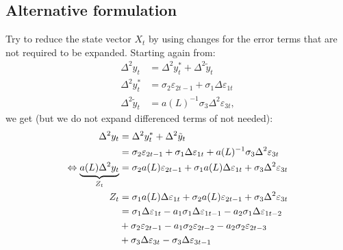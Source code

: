\documentclass[a4paper,12pt]{article}
\begin{document}
\pagebreak 

\subsection{Alternative formulation}

Try to reduce the state vector $X_{t}$ by using changes for the error terms
that are not required to be expanded. Starting again from:%
\begin{align}
\Delta ^{2}y_{t}& =\Delta ^{2}y_{t}^{\ast }+\Delta ^{2}\tilde{y}_{t} \\
\Delta ^{2}y_{t}^{\ast }& =\sigma _{2}\varepsilon _{2t-1}+\sigma _{1}\Delta
\varepsilon _{1t} \\
\Delta ^{2}\tilde{y}_{t}& =a(L)^{-1}\sigma _{3}\Delta ^{2}\varepsilon _{3t},
\end{align}%
we get (but we do not expand differenced terms of not needed):%
\begin{align}
\Delta ^{2}y_{t}& =\Delta ^{2}y_{t}^{\ast }+\Delta ^{2}\tilde{y}_{t}  \notag
\\
& =\sigma _{2}\varepsilon _{2t-1}+\sigma _{1}\Delta \varepsilon
_{1t}+a(L)^{-1}\sigma _{3}\Delta ^{2}\varepsilon _{3t}  \notag \\
\Leftrightarrow \underbrace{a(L)\Delta ^{2}y_{t}}_{Z_{t}}& =\sigma
_{2}a(L)\varepsilon _{2t-1}+\sigma _{1}a(L)\Delta \varepsilon _{1t}+\sigma
_{3}\Delta ^{2}\varepsilon _{3t}  \notag \\
Z_{t}& =\sigma _{1}a(L)\Delta \varepsilon _{1t}+\sigma _{2}a(L)\varepsilon
_{2t-1}+\sigma _{3}\Delta ^{2}\varepsilon _{3t}  \notag \\
& =\sigma _{1}\Delta \varepsilon _{1t}-a_{1}\sigma _{1}\Delta \varepsilon
_{1t-1}-a_{2}\sigma _{1}\Delta \varepsilon _{1t-2}  \notag \\
& +\sigma _{2}\varepsilon _{2t-1}-a_{1}\sigma _{2}\varepsilon
_{2t-2}-a_{2}\sigma _{2}\varepsilon _{2t-3} \\
& +\sigma _{3}\Delta \varepsilon _{3t}-\sigma _{3}\Delta \varepsilon _{3t-1}
\notag
\end{align}
\end{document}
